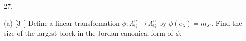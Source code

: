 27.

(a) [3--] Define a linear transformation $\phi:\Lambda^n_{\mathbb{Q}}\to\Lambda^n_{\mathbb{Q}}$ by $\phi(e_\lambda)=m_{\lambda'}$. Find the size of the largest block in the Jordan canonical form of $\phi$.
